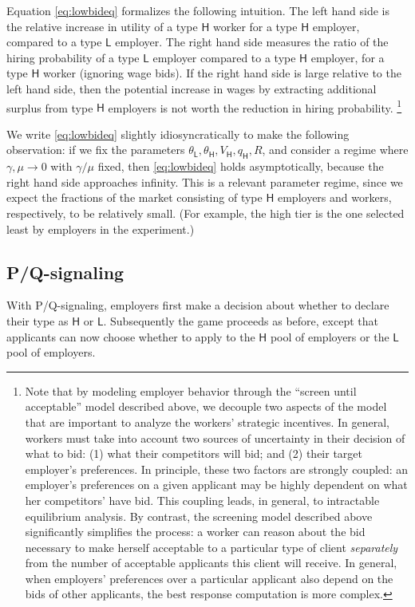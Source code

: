 \documentclass[prodmode,acmec]{ec-acmsmall}
\renewcommand{\H}{\ensuremath{\mathsf{H}}}
\renewcommand{\L}{\ensuremath{\mathsf{L}}}
\newcommand{\hottowel}{P/Q-signaling}
\begin{document}
Equation \eqref{eq:lowbideq} formalizes the following intuition.
The left hand side is the relative increase in utility of a type $\H$ worker for a type $\H$ employer, compared to a type $\L$ employer.
The right hand side measures the ratio of the hiring probability of a type $\L$ employer compared to a type $\H$ employer, for a type $\H$ worker (ignoring wage bids).
If the right hand side is large relative to the left hand side, then the potential increase in wages by extracting additional surplus from type $\H$ employers is not worth the reduction in hiring probability.
\footnote{Note that by modeling employer behavior through the ``screen until acceptable'' model described above, we  decouple two aspects of the model that are important to analyze the workers' strategic incentives.
In general, workers must take into account two sources of uncertainty in their decision of what to bid: (1) what their competitors will bid; and (2) their target employer's preferences.
In principle, these two factors are strongly coupled: an employer's preferences on a given applicant may be highly dependent on what her competitors' have bid.
This coupling leads, in general, to intractable equilibrium analysis.
By contrast, the screening model described above significantly simplifies the process: a worker can reason about the bid necessary to make herself acceptable to a particular type of client {\em separately} from the number of acceptable applicants this client will receive.
In general, when employers' preferences over a particular applicant also depend on the bids of other applicants, the best response computation is more complex.}

We write \eqref{eq:lowbideq} slightly idiosyncratically to make the following observation: if we fix the parameters $\theta_\L, \theta_\H, V_\H, q_\H, R$, and consider a regime where $\gamma, \mu \to 0$ with $\gamma/\mu$ fixed, then \eqref{eq:lowbideq} holds asymptotically, because the right hand side approaches infinity.
This is a relevant parameter regime, since we expect the fractions of the market consisting of type $\H$ employers and workers, respectively, to be relatively small.  (For example, the high tier is the one selected least by employers in the experiment.)


\subsection{\hottowel}

With \hottowel, employers first make a decision about whether to declare their type as $\H$ or $\L$.
Subsequently the game proceeds as before, except that applicants can now choose whether to apply to the $\H$ pool of employers or the $\L$ pool of employers.
\end{document}

